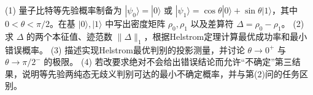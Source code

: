 (1) 量子比特等先验概率制备为 \(|\psi_0\rangle=|0\rangle\) 或 \(|\psi_1\rangle=\cos\theta|0\rangle+\sin\theta|1\rangle\)，其中 \(0<\theta<\pi/2\)。在基 \(|0\rangle,|1\rangle\) 中写出密度矩阵 \(\rho_0,\rho_1\) 以及差算符 \(\Delta=\rho_0-\rho_1\)。
(2) 求 \(\Delta\) 的两个本征值、迹范数 \(\|\Delta\|_1\)，根据Helstrom定理计算最优成功率和最小错误概率。
(3) 描述实现Helstrom最优判别的投影测量，并讨论 \(\theta\to0^+\) 与 \(\theta\to\pi/2^-\) 的极限。
(4) 若改要求绝对不会给出错误结论而允许“不确定”第三结果，说明等先验两纯态无歧义判别可达的最小不确定概率，并与第(2)问的任务区别。
